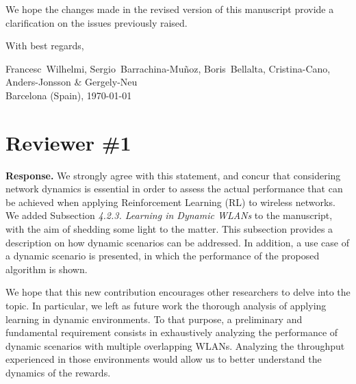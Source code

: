 \documentclass[a4paper,twoside,11pt]{reviewresponse}
\newenvironment{bottompar}{\par\vspace*{\fill}}{\clearpage}
\begin{document}
    We hope the changes made in the revised version of this manuscript provide a clarification on the issues previously raised.  
    
    With best regards,
    

	\begin{bottompar}
		\begin{flushright}
			Francesc~Wilhelmi, Sergio~Barrachina-Mu\~noz, Boris~Bellalta, Cristina-Cano, Anders-Jonsson \& Gergely-Neu\\
			Barcelona (Spain), \today
		\end{flushright}
	\end{bottompar}
	
	
	
	\section{Reviewer \#1}
	
	
	\textbf{Response.} We strongly agree with this statement, and concur that considering network dynamics is essential in order to assess the actual performance that can be achieved when applying Reinforcement Learning (RL) to wireless networks. We added Subsection \textit{4.2.3. Learning in Dynamic WLANs} to the manuscript, with the aim of shedding some light to the matter. This subsection provides a description on how dynamic scenarios can be addressed. In addition, a use case of a dynamic scenario is presented, in which the performance of the proposed algorithm is shown.
	
	We hope that this new contribution encourages other researchers to delve into the topic. In particular, we left as future work the thorough analysis of applying learning in dynamic environments. To that purpose, a preliminary and fundamental requirement consists in  exhaustively analyzing the performance of dynamic scenarios with multiple overlapping WLANs. Analyzing the throughput experienced in those environments would allow us to better understand the dynamics of the rewards.
	
\end{document}
